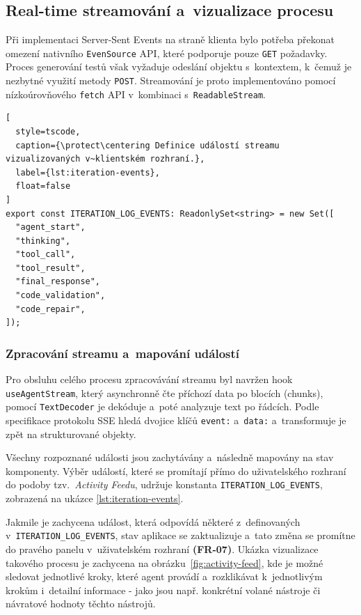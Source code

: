 \documentclass[czech, ing, kiv, he, iso690numb, viewonly]{fasthesis}
\begin{document}
\subsection{Real-time streamování a~vizualizace procesu}

Při implementaci Server-Sent Events na straně klienta bylo potřeba překonat omezení 
nativního \texttt{EvenSource} API, které podporuje pouze \texttt{GET} požadavky.
Proces generování testů však vyžaduje odeslání objektu s~kontextem, k~čemuž je nezbytné 
využití metody \texttt{POST}. Streamování je proto implementováno pomocí nízkoúrovňového
 \texttt{fetch} API v~kombinaci s~\texttt{ReadableStream}.



 \begin{lstlisting}[
  style=tscode,
  caption={\protect\centering Definice událostí streamu vizualizovaných v~klientském rozhraní.},
  label={lst:iteration-events},
  float=false
]
export const ITERATION_LOG_EVENTS: ReadonlySet<string> = new Set([
  "agent_start",
  "thinking",
  "tool_call",
  "tool_result",
  "final_response",
  "code_validation",
  "code_repair",
]);
\end{lstlisting}

\subsubsection*{Zpracování streamu a~mapování událostí}

Pro obsluhu celého procesu zpracovávání streamu byl navržen hook \texttt{useAgentStream},
který asynchronně čte příchozí data po blocích (chunks), pomocí \texttt{TextDecoder} je dekóduje
a~poté analyzuje text po řádcích. Podle specifikace protokolu SSE hledá dvojice klíčů \texttt{event:} a~\texttt{data:} 
a~transformuje je zpět na strukturované objekty.

Všechny rozpoznané události jsou zachytávány a~následně mapovány na stav komponenty.
Výběr událostí, které se promítají přímo do uživatelského rozhraní do podoby tzv.~\textit{Activity Feedu}, 
udržuje konstanta \texttt{ITERATION\_LOG\_EVENTS}, zobrazená na ukázce \ref{lst:iteration-events}.

Jakmile je zachycena událost, která odpovídá některé z~definovaných v~\texttt{ITERATION\_LOG\_EVENTS}, 
stav aplikace se zaktualizuje a~tato změna se promítne do pravého panelu v~uživatelském rozhraní \textbf{(FR-07)}.
Ukázka vizualizace takového procesu je zachycena na obrázku~\ref{fig:activity-feed}, kde je možné sledovat jednotlivé kroky, které agent provádí a~rozklikávat k~jednotlivým krokům i~detailní informace - jako jsou např. konkrétní volané nástroje či návratové hodnoty těchto nástrojů.
\end{document}
